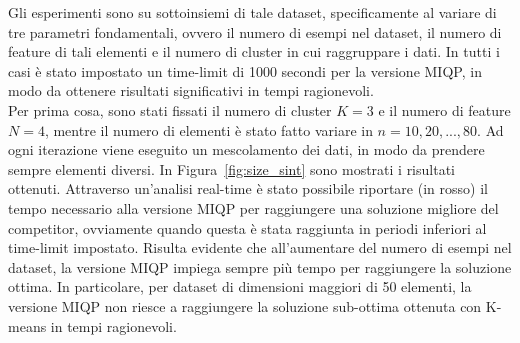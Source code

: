 \documentclass{article}
\begin{document}
    Gli esperimenti sono su sottoinsiemi di tale dataset, specificamente al variare di tre parametri fondamentali, ovvero il numero di esempi nel dataset, il numero di feature di tali elementi e il numero di cluster in cui raggruppare i dati. In tutti i casi è stato impostato un time-limit di 1000 secondi per la versione MIQP, in modo da ottenere risultati significativi in tempi ragionevoli.\\
    Per prima cosa, sono stati fissati il numero di cluster $K=3$ e il numero di feature $N=4$, mentre il numero di elementi è stato fatto variare in $n=10,20,...,80$. Ad ogni iterazione viene eseguito un mescolamento dei dati, in modo da prendere sempre elementi diversi. In Figura~\ref{fig:size_sint} sono mostrati i risultati ottenuti. Attraverso un'analisi real-time è stato possibile riportare (in rosso) il tempo necessario alla versione MIQP per raggiungere una soluzione migliore del competitor, ovviamente quando questa è stata raggiunta in periodi inferiori al time-limit impostato.
    Risulta evidente che all'aumentare del numero di esempi nel dataset, la versione MIQP impiega sempre più tempo per raggiungere la soluzione ottima. In particolare, per dataset di dimensioni maggiori di 50 elementi, la versione MIQP non riesce a raggiungere la soluzione sub-ottima ottenuta con K-means in tempi ragionevoli.\\
\end{document}
